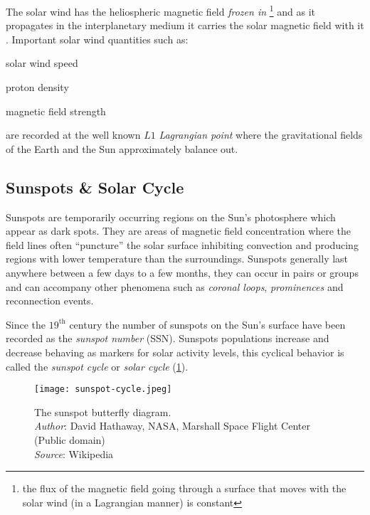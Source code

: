The solar wind has the heliospheric magnetic field \emph{frozen in} \footnote{the flux of the 
magnetic field going through a surface that moves with the solar wind (in a Lagrangian manner) is 
constant} and as it propagates in the interplanetary medium it carries the solar magnetic field 
with it \citep{alfven1942existence,alfven1943existence}. Important solar wind quantities such as: 
%
\begin{enumerate*} 
    \item solar wind speed 
    \item proton density 
    \item magnetic field strength 
\end{enumerate*}
% 
are recorded at the well known $L1$ \emph{Lagrangian point} where the gravitational fields of the 
Earth and the Sun approximately balance out.



\subsection{Sunspots \& Solar Cycle}\label{sec:sunspots}

Sunspots are temporarily occurring regions on the Sun's photosphere which appear as dark spots. 
They are areas of magnetic field concentration where the field lines often \enquote{puncture} the 
solar surface inhibiting convection and producing regions with lower temperature than the 
surroundings. Sunspots generally last anywhere between a few days to a few months, they can occur 
in pairs or groups and can accompany other phenomena such as \emph{coronal loops}, 
\emph{prominences} and reconnection events.

Since the $19^{\text{th}}$ century the number of sunspots on the Sun's surface have been recorded 
as the \emph{sunspot number} (SSN). Sunspots populations increase and decrease behaving as markers 
for solar activity levels, this cyclical behavior is called the \emph{sunspot cycle} or 
\emph{solar cycle} (\cref{fig:SolarCycle}). 

\begin{figure}
    \noindent\texttt{[image: sunspot-cycle.jpeg]}
    \caption{{\small The sunspot butterfly diagram.  \\ 
    \textit{Author}: David Hathaway, NASA, Marshall Space Flight Center (Public domain) \\ 
    \textit{Source}: Wikipedia}}
    \label{fig:SolarCycle}
\end{figure}

